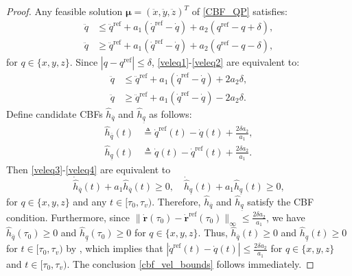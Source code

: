 \documentclass[journal,10pt]{IEEEtran}
\newcommand{\vect}[1]{\boldsymbol{\mathbf{#1}}}
\begin{document}
\begin{proof}
Any feasible solution $\vect{\mu} = (\ddot{x},\ddot{y},\ddot{z})^T$ of \eqref{CBF_QP} satisfies:
\begin{subequations}
\begin{align}
    \ddot{q}&\leq \ddot{q}^{\text{ref}}+a_1(\dot{q}^{\text{ref}}-\dot{q})+a_2(q^{\text{ref}}-q+\delta),\label{veleq1}\\
    \ddot{q}&\geq \ddot{q}^{\text{ref}} + a_1(\dot{q}^{\text{ref}}-\dot{q}) + a_2(q^{\text{ref}} -q - \delta),\label{veleq2}
\end{align}
\end{subequations}
for $q\in\{x,y,z\}$. Since $|q-q^{\text{ref}}|\leq \delta$, \eqref{veleq1}-\eqref{veleq2} are equivalent to:
\begin{subequations}
\begin{align}
    \ddot{q}&\leq \ddot{q}^{\text{ref}}+a_1(\dot{q}^{\text{ref}}-\dot{q})+2a_2\delta,\label{veleq3}\\
    \ddot{q}&\geq \ddot{q}^{\text{ref}} + a_1(\dot{q}^{\text{ref}}-\dot{q}) - 2a_2\delta.\label{veleq4}
\end{align}
\end{subequations}
Define candidate CBFs $\hat{h}_{\overline{q}}$ and $\hat{h}_{\underline{q}}$ as follows:
\begin{align*}
\hat{h}_{\overline{q}}(t)&\triangleq \dot{q}^{\text{ref}}(t)-\dot{q}(t)+ \frac{2\delta a_2}{a_1},\\ \hat{h}_{\underline{q}}(t)&\triangleq \dot{q}(t) - \dot{q}^{\text{ref}}(t) + \frac{2\delta a_2}{a_1}.
\end{align*}
Then \eqref{veleq3}-\eqref{veleq4} are equivalent to 
$$
\dot{\hat{h}}_{\overline{q}}(t)+a_1\hat{h}_{\overline{q}}(t)\geq 0,\quad \dot{\hat{h}}_{\underline{q}}(t)+a_1\hat{h}_{\underline{q}}(t)\geq 0,
$$
for $q\in\{x,y,z\}$ and any $t\in[\tau_0,\tau_v)$. Therefore,  $\hat{h}_{\overline{q}}$ and $\hat{h}_{\underline{q}}$ satisfy the CBF condition. Furthermore, 
since $\|\dot{\vect{r}}(\tau_0) -\dot{\vect{r}}^{\text{ref}}(\tau_0)\|_{\infty} \leq \frac{2\delta a_2}{a_1}$, we have $\hat{h}_{\overline{q}}(\tau_0)\geq 0$ and $\hat{h}_{\underline{q}}(\tau_0)\geq 0$ for $q\in\{x,y,z\}$. Thus, $\hat{h}_{\overline{q}}(t)\geq 0$ and $\hat{h}_{\underline{q}}(t)\geq 0$ for $t\in[\tau_0,\tau_v)$ by \cite{ames2016control}, which implies that $|\dot{q}^{\text{ref}}(t)-\dot{q}(t)|\leq \frac{2\delta a_2}{a_1}$ for $q\in\{x,y,z\}$ and $t\in[\tau_0,\tau_v)$. The conclusion \eqref{cbf_vel_bounds} follows immediately.

\end{proof}
\end{document}
